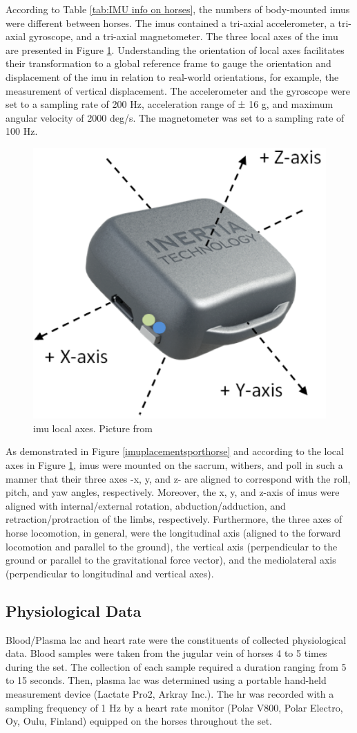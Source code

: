 According to Table \ref{tab:IMU info on horses}, the numbers of body-mounted \gls{imu}s were different between horses. The \gls{imu}s contained a tri-axial accelerometer, a tri-axial gyroscope, and a tri-axial magnetometer. The three local axes of the \gls{imu} are presented in Figure \ref{IMUaxes}. Understanding the orientation of local axes facilitates their transformation to a global reference frame to gauge the orientation and displacement of the \gls{imu} in relation to real-world orientations, for example, the measurement of vertical displacement. The accelerometer and the gyroscope were set to a sampling rate of 200 Hz, acceleration range of ± 16 g, and maximum angular velocity of 2000 deg/s. The magnetometer was set to a sampling rate of 100 Hz.

\begin{figure}[!htb]
\centering
\includegraphics[width=.3\linewidth]{chapters/data/figures/imu.png}
\caption{\gls{imu} local axes. Picture from \cite{a2020_user}}
\label{IMUaxes}
\end{figure}

As demonstrated in Figure \ref{imuplacementsporthorse} and according to the local axes in Figure \ref{IMUaxes}, \gls{imu}s were mounted on the sacrum, withers, and poll in such a manner that their three axes -x, y, and z- are aligned to correspond with the roll, pitch, and yaw angles, respectively. Moreover, the x, y, and z-axis of \gls{imu}s were aligned with internal/external rotation, abduction/adduction, and retraction/protraction of the limbs, respectively. Furthermore, the three axes of horse locomotion, in general, were the longitudinal axis (aligned to the forward locomotion and parallel to the ground), the vertical axis (perpendicular to the ground or parallel to the gravitational force vector), and the mediolateral axis (perpendicular to longitudinal and vertical axes).

\subsection{Physiological Data}
Blood/Plasma \gls{lac} and heart rate were the constituents of collected physiological data. Blood samples were taken from the jugular vein of horses 4 to 5 times during the \gls{set}. The collection of each sample required a duration ranging from 5 to 15 seconds. Then, plasma \gls{lac} was determined using a portable hand-held measurement device (Lactate Pro2, Arkray Inc.). The \gls{hr} was recorded with a sampling frequency of 1 Hz by a heart rate monitor (Polar V800, Polar Electro, Oy, Oulu, Finland) equipped on the horses throughout the \gls{set}.

